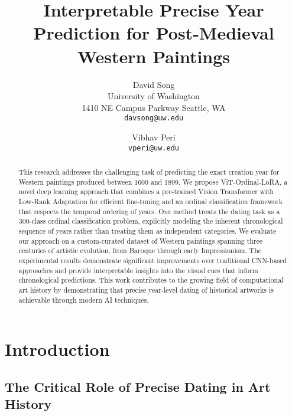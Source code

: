 \documentclass[10pt,twocolumn,letterpaper]{article}
\begin{document}
\title{Interpretable Precise Year Prediction for Post-Medieval Western Paintings}

\author{David Song\\
University of Washington\\
1410 NE Campus Parkway Seattle, WA\\
{\tt\small davsong@uw.edu}
\and
Vibhav Peri\\
{\tt\small vperi@uw.edu}
}
\maketitle

\begin{abstract}
This research addresses the challenging task of predicting the exact creation year for Western paintings produced between 1600 and 1899. We propose ViT-Ordinal-LoRA, a novel deep learning approach that combines a pre-trained Vision Transformer with Low-Rank Adaptation for efficient fine-tuning and an ordinal classification framework that respects the temporal ordering of years. Our method treats the dating task as a 300-class ordinal classification problem, explicitly modeling the inherent chronological sequence of years rather than treating them as independent categories. We evaluate our approach on a custom-curated dataset of Western paintings spanning three centuries of artistic evolution, from Baroque through early Impressionism. The experimental results demonstrate significant improvements over traditional CNN-based approaches and provide interpretable insights into the visual cues that inform chronological predictions. This work contributes to the growing field of computational art history by demonstrating that precise year-level dating of historical artworks is achievable through modern AI techniques.
\end{abstract}

\section{Introduction}

\subsection{The Critical Role of Precise Dating in Art History}
\end{document}
